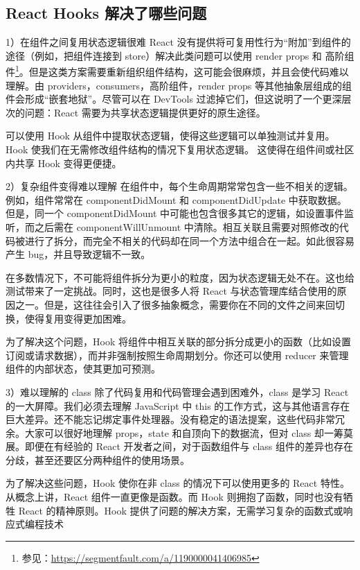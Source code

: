 \documentclass[../../../interview-questions.tex]{subfiles}
\begin{document}
\subsection{React Hooks 解决了哪些问题}

1）在组件之间复用状态逻辑很难
React 没有提供将可复用性行为“附加”到组件的途径（例如，把组件连接到 store）解决此类问题可以使用 render props 和 高阶组件\footnote{参见：\url{https://segmentfault.com/a/1190000041406985}}。但是这类方案需要重新组织组件结构，这可能会很麻烦，并且会使代码难以理解。由 providers，consumers，高阶组件，render props 等其他抽象层组成的组件会形成“嵌套地狱”。尽管可以在 DevTools 过滤掉它们，但这说明了一个更深层次的问题：React 需要为共享状态逻辑提供更好的原生途径。

可以使用 Hook 从组件中提取状态逻辑，使得这些逻辑可以单独测试并复用。Hook 使我们在无需修改组件结构的情况下复用状态逻辑。 这使得在组件间或社区内共享 Hook 变得更便捷。

2）复杂组件变得难以理解
在组件中，每个生命周期常常包含一些不相关的逻辑。例如，组件常常在 componentDidMount 和 componentDidUpdate 中获取数据。但是，同一个 componentDidMount 中可能也包含很多其它的逻辑，如设置事件监听，而之后需在 componentWillUnmount 中清除。相互关联且需要对照修改的代码被进行了拆分，而完全不相关的代码却在同一个方法中组合在一起。如此很容易产生 bug，并且导致逻辑不一致。

在多数情况下，不可能将组件拆分为更小的粒度，因为状态逻辑无处不在。这也给测试带来了一定挑战。同时，这也是很多人将 React 与状态管理库结合使用的原因之一。但是，这往往会引入了很多抽象概念，需要你在不同的文件之间来回切换，使得复用变得更加困难。

为了解决这个问题，Hook 将组件中相互关联的部分拆分成更小的函数（比如设置订阅或请求数据），而并非强制按照生命周期划分。你还可以使用 reducer 来管理组件的内部状态，使其更加可预测。

3）难以理解的 class
除了代码复用和代码管理会遇到困难外，class 是学习 React 的一大屏障。我们必须去理解 JavaScript 中 this 的工作方式，这与其他语言存在巨大差异。还不能忘记绑定事件处理器。没有稳定的语法提案，这些代码非常冗余。大家可以很好地理解 props，state 和自顶向下的数据流，但对 class 却一筹莫展。即便在有经验的 React 开发者之间，对于函数组件与 class 组件的差异也存在分歧，甚至还要区分两种组件的使用场景。

为了解决这些问题，Hook 使你在非 class 的情况下可以使用更多的 React 特性。 从概念上讲，React 组件一直更像是函数。而 Hook 则拥抱了函数，同时也没有牺牲 React 的精神原则。Hook 提供了问题的解决方案，无需学习复杂的函数式或响应式编程技术
\end{document}
